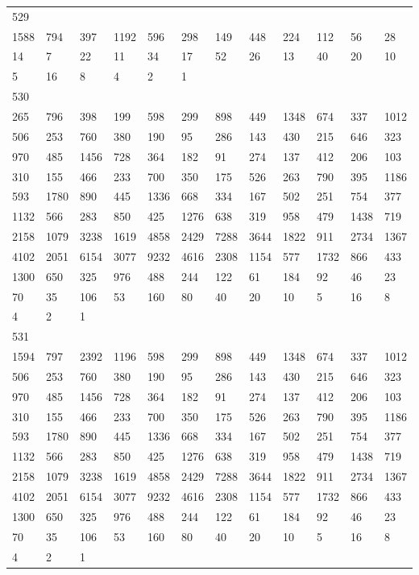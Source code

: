 \begin{longtable}{llllllllllll}
529&&&&&&&&&&&\\
1588& 794& 397& 1192& 596& 298& 149& 448& 224& 112& 56& 28\\
14& 7& 22& 11& 34& 17& 52& 26& 13& 40& 20& 10\\
5& 16& 8& 4& 2& 1& \\

530&&&&&&&&&&&\\
265& 796& 398& 199& 598& 299& 898& 449& 1348& 674& 337& 1012\\
506& 253& 760& 380& 190& 95& 286& 143& 430& 215& 646& 323\\
970& 485& 1456& 728& 364& 182& 91& 274& 137& 412& 206& 103\\
310& 155& 466& 233& 700& 350& 175& 526& 263& 790& 395& 1186\\
593& 1780& 890& 445& 1336& 668& 334& 167& 502& 251& 754& 377\\
1132& 566& 283& 850& 425& 1276& 638& 319& 958& 479& 1438& 719\\
2158& 1079& 3238& 1619& 4858& 2429& 7288& 3644& 1822& 911& 2734& 1367\\
4102& 2051& 6154& 3077& 9232& 4616& 2308& 1154& 577& 1732& 866& 433\\
1300& 650& 325& 976& 488& 244& 122& 61& 184& 92& 46& 23\\
70& 35& 106& 53& 160& 80& 40& 20& 10& 5& 16& 8\\
4& 2& 1& \\

531&&&&&&&&&&&\\
1594& 797& 2392& 1196& 598& 299& 898& 449& 1348& 674& 337& 1012\\
506& 253& 760& 380& 190& 95& 286& 143& 430& 215& 646& 323\\
970& 485& 1456& 728& 364& 182& 91& 274& 137& 412& 206& 103\\
310& 155& 466& 233& 700& 350& 175& 526& 263& 790& 395& 1186\\
593& 1780& 890& 445& 1336& 668& 334& 167& 502& 251& 754& 377\\
1132& 566& 283& 850& 425& 1276& 638& 319& 958& 479& 1438& 719\\
2158& 1079& 3238& 1619& 4858& 2429& 7288& 3644& 1822& 911& 2734& 1367\\
4102& 2051& 6154& 3077& 9232& 4616& 2308& 1154& 577& 1732& 866& 433\\
1300& 650& 325& 976& 488& 244& 122& 61& 184& 92& 46& 23\\
70& 35& 106& 53& 160& 80& 40& 20& 10& 5& 16& 8\\
4& 2& 1& \\


\end{longtable}
